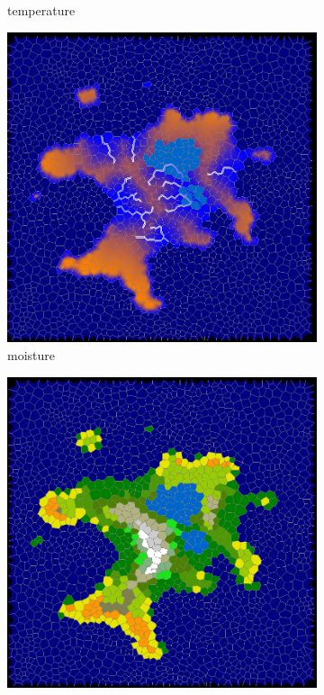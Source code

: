 \documentclass[journal, letterpaper]{IEEEtran}
\begin{document}
\begin{figure}
\begin{subfigure}[b]{0.3\textwidth}
		\caption{temperature}
		\label{fig:temperature}
	\end{subfigure}
	\begin{subfigure}[b]{0.3\textwidth}
		\includegraphics[width=\textwidth]{images/moisture}
		\caption{moisture}
		\label{fig:moisture}
	\end{subfigure}
	\begin{subfigure}[b]{0.3\textwidth}
		\includegraphics[width=\textwidth]{images/biomes}

\end{subfigure}
\end{figure}
\end{document}
